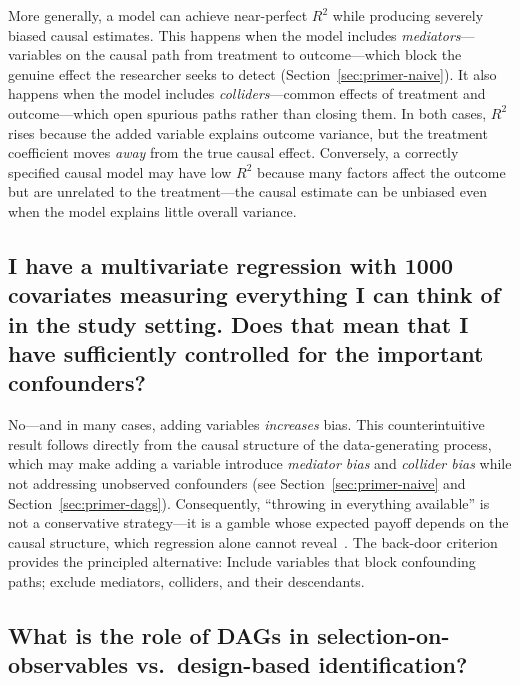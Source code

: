 More generally, a model can achieve near-perfect $R^2$ while producing severely biased causal estimates.
This happens when the model includes \emph{mediators}---variables on the causal path from treatment to outcome---which block the genuine effect the researcher seeks to detect (Section~\ref{sec:primer-naive}).
It also happens when the model includes \emph{colliders}---common effects of treatment and outcome---which open spurious paths rather than closing them.
In both cases, $R^2$ rises because the added variable explains outcome variance, but the treatment coefficient moves \emph{away} from the true causal effect.
Conversely, a correctly specified causal model may have low $R^2$ because many factors affect the outcome but are unrelated to the treatment---the causal estimate can be unbiased even when the model explains little overall variance.

\subsection{I have a multivariate regression with 1000 covariates measuring everything I can think of in the study setting. Does that mean that I have sufficiently controlled for the important confounders?}

No---and in many cases, adding variables \emph{increases} bias.
This counterintuitive result follows directly from the causal structure of the data-generating process, which may make adding a variable introduce \emph{mediator bias} and \emph{collider bias} while not addressing unobserved confounders (see Section~\ref{sec:primer-naive} and Section~\ref{sec:primer-dags}).
Consequently, ``throwing in everything available'' is not a conservative strategy---it is a gamble whose expected payoff depends on the causal structure, which regression alone cannot reveal~\cite{wysocki2022statistical}.
The back-door criterion provides the principled alternative: Include variables that block confounding paths; exclude mediators, colliders, and their descendants.

\subsection{What is the role of DAGs in selection-on-observables vs.\ design-based identification?}

